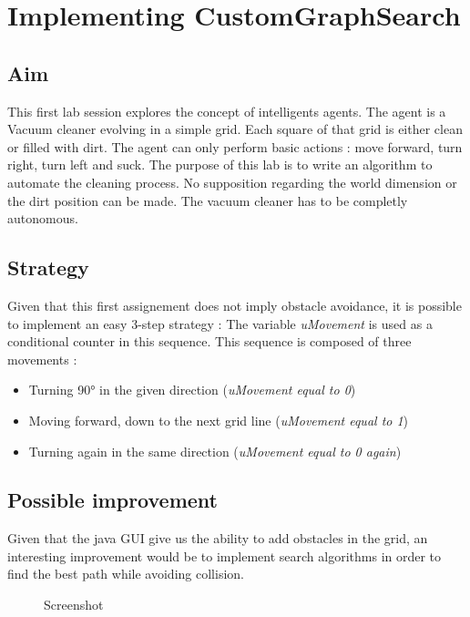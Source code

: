 \section{Implementing CustomGraphSearch}
 \thispagestyle{empty}
\subsection{Aim}

This first lab session explores the concept of intelligents agents. The agent is a
Vacuum cleaner evolving in a simple grid. Each square of that grid is either clean
or filled with dirt. The agent can only perform basic actions :
move forward, turn right, turn left and suck.
The purpose of this lab is to write an algorithm to automate the cleaning process.
No supposition regarding the world dimension or the dirt position can be made.
The vacuum cleaner has to be completly autonomous.
\subsection{Strategy}
Given that this first assignement does not imply obstacle avoidance, it is possible
to implement an easy 3-step strategy :
The variable \textit{uMovement} is used as a conditional counter in this sequence.
\newpage This sequence is composed of three movements :
\begin{itemize}
  \item Turning 90° in the given direction (\textit{uMovement equal to 0})
  \item Moving forward, down to the next grid line (\textit{uMovement equal to 1})
  \item Turning again in the same direction (\textit{uMovement equal to 0 again})
\end{itemize}

\subsection{Possible improvement}

Given that the java GUI give us the ability to add obstacles in the grid,
an interesting improvement would be to implement search algorithms in order to
find the best path while avoiding collision.

\begin{figure}[h]
    \centering
    \caption{Screenshot\label{Vacuum cleaner}}
\end{figure}

